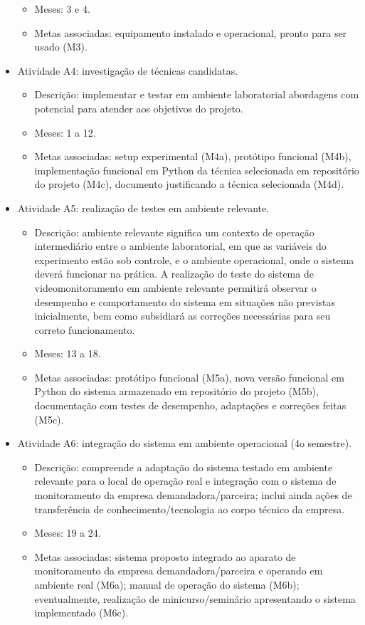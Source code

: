\begin{itemize}
\begin{itemize}
		\item Meses: 3 e 4.
		\item Metas associadas: equipamento instalado e operacional, pronto para ser usado (M3).
	\end{itemize}
	\item Atividade A4: investigação de técnicas candidatas.
	\begin{itemize}
		\item Descrição: implementar e testar em ambiente laboratorial abordagens com potencial para atender aos objetivos do projeto.
		\item Meses: 1 a 12.
		\item Metas associadas: setup experimental (M4a), protótipo funcional (M4b), implementação funcional em Python da técnica selecionada em repositório do projeto (M4c), documento justificando a técnica selecionada (M4d).
	\end{itemize}
	\item Atividade A5: realização de testes em ambiente relevante.
	\begin{itemize}
		\item Descrição: ambiente relevante significa um contexto de operação intermediário entre o ambiente laboratorial, em que as variáveis do experimento estão sob controle, e o ambiente operacional, onde o sistema deverá funcionar na prática. A realização de teste do sistema de videomonitoramento em ambiente relevante permitirá observar o desempenho e comportamento do sistema em situações não previstas inicialmente, bem como subsidiará as correções necessárias para seu correto funcionamento.
		\item Meses: 13 a 18.
		\item Metas associadas: protótipo funcional (M5a), nova versão funcional em Python do sistema armazenado em repositório do projeto (M5b), documentação com testes de desempenho, adaptações e correções feitas (M5c).
	\end{itemize}
	\item Atividade A6: integração do sistema em ambiente operacional (4o semestre).
	\begin{itemize}
		\item Descrição: compreende a adaptação do sistema testado em ambiente relevante para o local de operação real e integração com o sistema de monitoramento da empresa demandadora/parceira; inclui ainda ações de transferência de conhecimento/tecnologia ao corpo técnico da empresa.
		\item Meses: 19 a 24.
		\item Metas associadas: sistema proposto integrado ao aparato de monitoramento da empresa demandadora/parceira e operando em ambiente real (M6a); manual de operação do sistema (M6b); eventualmente, realização de minicurso/seminário apresentando o sistema implementado (M6c).

\end{itemize}
\end{itemize}
